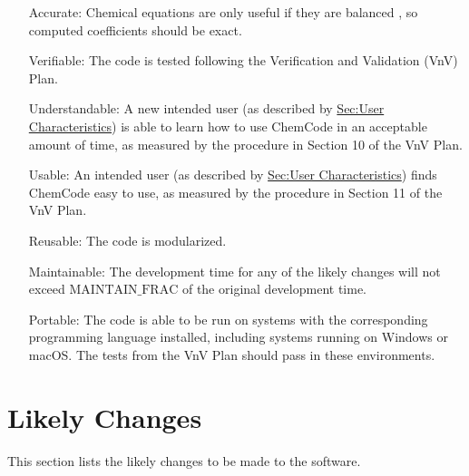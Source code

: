 \documentclass[12pt]{article}
\begin{document}
\begin{itemize}
\item[Accurate:\phantomsection\label{accurate}]{Chemical equations are only useful if they are balanced \cite{lund2023}, so computed coefficients should be exact.}
\item[Verifiable:\phantomsection\label{verifiable}]{The code is tested following the Verification and Validation (VnV) Plan.}
\item[Understandable:\phantomsection\label{understandable}]{A new intended user (as described by \hyperref[Sec:UserChars]{Sec:User Characteristics}) is able to learn how to use ChemCode in an acceptable amount of time, as measured by the procedure in Section 10 of the VnV Plan.}
\item[Usable:\phantomsection\label{usable}]{An intended user (as described by \hyperref[Sec:UserChars]{Sec:User Characteristics}) finds ChemCode easy to use, as measured by the procedure in Section 11 of the VnV Plan.}
\item[Reusable:\phantomsection\label{reusable}]{The code is modularized.}
\item[Maintainable:\phantomsection\label{maintainable}]{The development time for any of the likely changes will not exceed $\text{MAINTAIN_FRAC}$ of the original development time.}
\item[Portable:\phantomsection\label{portable}]{The code is able to be run on systems with the corresponding programming language installed, including systems running on Windows or macOS. The tests from the VnV Plan should pass in these environments.}
\end{itemize}
\section{Likely Changes}
\label{Sec:LCs}
This section lists the likely changes to be made to the software.
\end{document}

